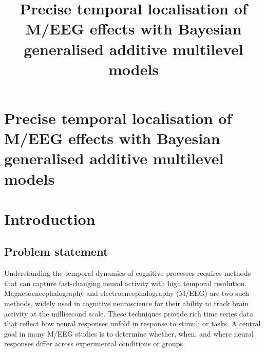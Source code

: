 \documentclass[
  doc,
  floatsintext,
  longtable,
  a4paper,
  nolmodern,
  notxfonts,
  notimes,
  colorlinks=true,linkcolor=blue,citecolor=blue,urlcolor=blue]{apa7}
\title{Precise temporal localisation of M/EEG effects with Bayesian
generalised additive multilevel models}
\begin{document}
\maketitle


\hypertarget{toc}{}
\tableofcontents
\newpage
\section[Introduction]{Precise temporal localisation of M/EEG effects
with Bayesian generalised additive multilevel models}

\setcounter{secnumdepth}{3}

\setlength\LTleft{0pt}

\resetlinenumber[1]



\setlength{\parindent}{0pt}
\setlength{\parskip}{6pt}

\section{Introduction}\label{introduction}

\subsection{Problem statement}\label{problem-statement}

Understanding the temporal dynamics of cognitive processes requires
methods that can capture fast-changing neural activity with high
temporal resolution. Magnetoencephalography and electroencephalography
(M/EEG) are two such methods, widely used in cognitive neuroscience for
their ability to track brain activity at the millisecond scale. These
techniques provide rich time series data that reflect how neural
responses unfold in response to stimuli or tasks. A central goal in many
M/EEG studies is to determine whether, when, and where neural responses
differ across experimental conditions or groups.
\end{document}
